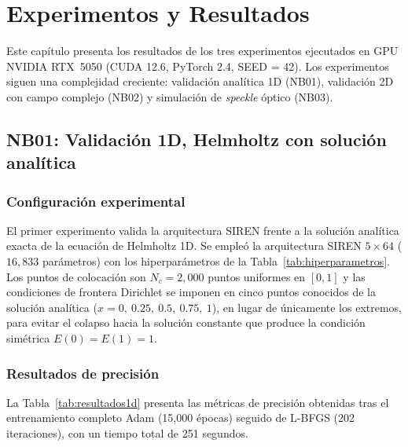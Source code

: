 \chapter{Experimentos y Resultados}\label{cap4:resultados}

Este capítulo presenta los resultados de los tres experimentos ejecutados en GPU
NVIDIA RTX~5050 (CUDA 12.6, PyTorch 2.4, SEED = 42). Los experimentos siguen
una complejidad creciente: validación analítica 1D (NB01), validación 2D con
campo complejo (NB02) y simulación de \textit{speckle} óptico (NB03).

\section{NB01: Validación 1D, Helmholtz con solución analítica}
\label{sec:resultados1d}

\subsection{Configuración experimental}

El primer experimento valida la arquitectura SIREN frente a la solución analítica
exacta de la ecuación de Helmholtz 1D. Se empleó la arquitectura SIREN
$5 \times 64$ ($16{,}833$ parámetros) con los hiperparámetros de la
Tabla~\ref{tab:hiperparametros}. Los puntos de colocación son $N_c = 2{,}000$
puntos uniformes en $[0,1]$ y las condiciones de frontera Dirichlet se imponen
en cinco puntos conocidos de la solución analítica ($x = 0,\ 0.25,\ 0.5,\ 0.75,\ 1$),
en lugar de únicamente los extremos, para evitar el colapso hacia la solución
constante que produce la condición simétrica $E(0) = E(1) = 1$.

\subsection{Resultados de precisión}

La Tabla~\ref{tab:resultados1d} presenta las métricas de precisión obtenidas
tras el entrenamiento completo Adam (15{,}000 épocas) seguido de L-BFGS
(202 iteraciones), con un tiempo total de 251 segundos.


